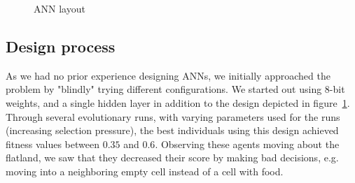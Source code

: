 \documentclass[twoside]{article}
\begin{document}
\begin{multicols}{2}
\begin{figure}[H]

    \caption{ANN layout} \label{fig:ann-layout}
  \end{figure}
  
  \subsection{Design process}

  As we had no prior experience designing ANNs,
  we initially approached the problem by "blindly" trying different configurations.
  We started out using 8-bit weights,
  and a single hidden layer in addition to the design depicted in figure~\ref{fig:ann-layout}.
  Through several evolutionary runs, with varying parameters used for the runs (increasing selection pressure),
  the best individuals using this design achieved fitness values between $0.35$ and $0.6$.
  Observing these agents moving about the flatland,
  we saw that they decreased their score by making bad decisions,
  e.g. moving into a neighboring empty cell instead of a cell with food.


\end{multicols}
\end{document}
